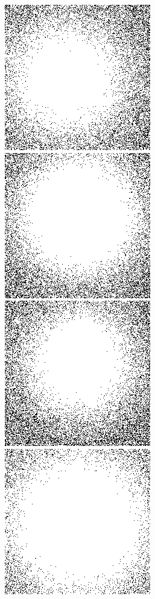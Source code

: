 \documentclass[a4paper,fleqn,usenatbib]{mnras}
\begin{document}
\begin{figure}
  \includegraphics[scale=0.4]{p5.png}
  \includegraphics[scale=0.4]{p6.png}
  \includegraphics[scale=0.4]{p7.png}
  \includegraphics[scale=0.4]{p8.png}

\end{figure}
\end{document}
